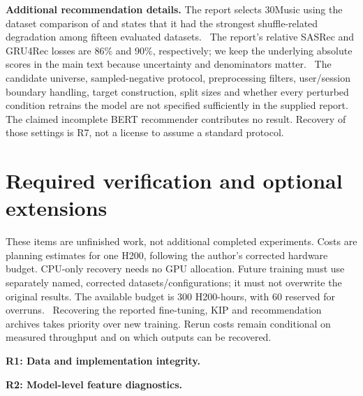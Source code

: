 \textbf{Additional recommendation details.} The report selects 30Music using the dataset comparison of \citet{klenitskiy2024} and states that it had the strongest shuffle-related degradation among fifteen evaluated datasets. \ou\ The report's relative SASRec and GRU4Rec losses are $86\%$ and $90\%$, respectively; we keep the underlying absolute scores in the main text because uncertainty and denominators matter. \ou\ The candidate universe, sampled-negative protocol, preprocessing filters, user/session boundary handling, target construction, split sizes and whether every perturbed condition retrains the model are not specified sufficiently in the supplied report. The claimed incomplete BERT recommender contributes no result. Recovery of those settings is R7, not a license to assume a standard protocol.

\section{Required verification and optional extensions}
\label{app:required}
These items are unfinished work, not additional completed experiments. Costs are planning estimates for one H200, following the author's corrected hardware budget. CPU-only recovery needs no GPU allocation. Future training must use separately named, corrected datasets/configurations; it must not overwrite the original results. The available budget is $300$ H200-hours, with $60$ reserved for overruns. \ Recovering the reported fine-tuning, KIP and recommendation archives takes priority over new training. Rerun costs remain conditional on measured throughput and on which outputs can be recovered.

\textbf{R1: Data and implementation integrity.} 

\textbf{R2: Model-level feature diagnostics.} 

